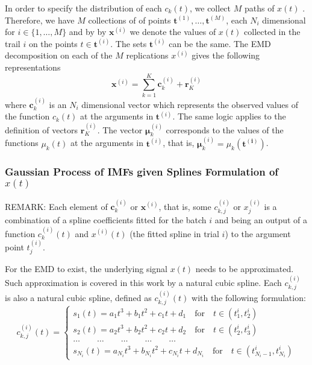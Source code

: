 In order to specify the distribution of each $c_k(t)$, we collect $M$ paths of $x(t)$ . Therefore, we have $M$ collections of of points $\mathbf{t}^{(1)} , \ldots, \mathbf{t}^{(M)}$, each $N_i$ dimensional for $i \in \Big\{1,\ldots,M\Big\}$ and by  by $\mathbf{x}^{(i)}$ we denote the values of $x(t)$ collected in the trail $i$ on the points $t \in \mathbf{t}^{(i)}$.  The sets $\mathbf{t}^{(i)}$ can be the same.
The EMD decomposition on each of the $M$ replications  $x^{(i)}$ gives the following representations
\begin{equation}
\mathbf{x}^{(i)} = \sum_{k = 1}^K \mathbf{c}_k^{(i)}+ \mathbf{r}^{(i)}_K 
\end{equation}
where $\mathbf{c}_k^{(i)}$ is an $N_i$ dimensional vector which represents the observed values of the function $c_k(t)$ at the arguments in $\mathbf{t}^{(i)}$. The same logic applies to the definition of vectors $\mathbf{r}^{(i)}_K $. The vector $\bm{\mu}_k^{(i)}$  corresponds to the values of the functions $\mu_k(t)$ at the arguments in $\mathbf{t}^{(i)}$, that is, $\bm{\mu}_k^{(i)} = \mu_k(\mathbf{\mathbf{t}^{(i)}})$.

\subsubsection{Gaussian Process of IMFs given Splines Formulation of $x(t)$}

{\color{red}
REMARK: Each element of $\mathbf{c}_k^{(i)}$ or $\mathbf{x}^{(i)}$, that is, some $c_{k,j}^{(i)}$ or $x_{j}^{(i)}$ is a combination of a spline coefficients fitted for the batch $i$ and being an output of a function $c_k^{(i)}(t)$ and $x^{(i)}(t)$ (the fitted spline in trial $i$) to the argument point $t^{(i)}_j$.
}



For the EMD to exist, the underlying signal $x(t)$ needs to be approximated. Such approximation is covered in this work by a natural cubic spline. Each $c_{k,j}^{(i)}$  is also a natural cubic spline, defined as $c_{k,j}^{(i)}(t)$ with the following formulation:
\begin{equation*}
c_{k,j}^{(i)}(t) = \begin{cases}
s_1(t) = a_1 t^3 + b_1 t^2 + c_1 t + d_1 \quad \mbox{for} \quad t \in (t_1^i, t_2^i) \\
s_2(t) = a_2 t^3 + b_2 t^2 + c_2 t + d_2 \quad \mbox{for} \quad t \in (t_2^i, t_3^i)\\
\dots \quad \quad \dots \quad \quad \dots \quad \quad \dots \quad \quad \dots\\
s_{N_i}(t) = a_{N_i} t^3 + b_{N_i} t^2 + c_{N_i} t + d_{N_i} \quad \mbox{for} \quad t \in (t_{{N_i}-1}^i, t_{N_i}^i)
\end{cases}
\end{equation*}

